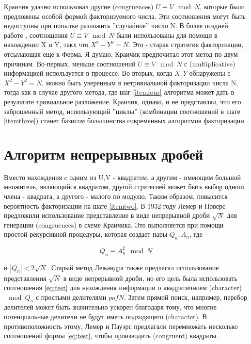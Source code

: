 \documentclass[russian, utf8, a4paper,12pt]{report}
\begin{document}
Краичик удачно использовал другие (congruences) $U \equiv V \mod N$, которые были предложены особой формой факторизуемого числа. Эти соотношения могут быть недоступны при попытке разложить  ''случайное'' число N. В более поздней работе \cite{krai2}, соотношения $U \equiv V \mod N$ были использованы для помощи в нахождении X и Y, такх что $X^2 - Y^2 = N$. Это - старая стратегия факторизации, отсылающая еще к Ферма. Я думаю, Краичик предпочитал этот метод по двум причинам. Во-первых, меньше соотношений $U \equiv V \mod N$ с (multiplicative) информацией используется в процессе. Во-вторых, когда $X, Y$ обнаружены с $X^2 - Y^2 = N$, можно быть уверенным в нетривиальной факторизации числа N, тогда как в случае другого метода, где шаг \ref{itemfour} алгоритма может дать в результате тривиальное разложение. Краичик, однако, и не представлял, что его заброшенный метод, использующий ''циклы'' (комбинации соотношений в шаге \ref{itemthree}) станет базисом большинства современных алгоритмов факторизации. 
\section{Алгоритм непрерывных дробей}
Вместо нахождения \sus   c одним из U,V - квадратом, а другим - имеющим большой множитель, являющийся квадратом, другой стратегией может быть выбор одного члена - квадрата, а другого - малого по модулю. Таким образом, повысится вероятность факторизации на шаге \ref{itemtwo}. В 1932 году Лемер и Поверс \cite{bull} предложили использование представление в виде непрерывной дроби $\sqrt{N}$ для генерации (congruences) \sus  в схеме Краичика. Это выполняется при помощи простой рекурсивной процедуры, которая создает пары $Q_{n}, A_{n}$, где

\begin{equation}\label{eq:test}
Q_{n} \equiv A_{n}^{2} \mod N
\end{equation}


и $|Q_{n}| < 2\sqrt{N}$. Старый метод Лежандра также предлагал использование представления $\sqrt{N}$ в виде непрерывной дроби, но его цель была использовать соотношения \eqref{eq:test} для нахождения информации о квадратичноем (character) $\mod Q_{n}$ с простыми делителями $p of N$. Затем прямой поиск, например, перебор делителей может быть значительно ускорен благодаря тому, что многие потенциальные делители не будут иметь подходящего (character). В противоположность этому, Лемер и Пауэрс предлагали перемножать несколько соотношений формы \eqref{eq:test}, чтобы производить (congruent) квадраты.
\end{document}
